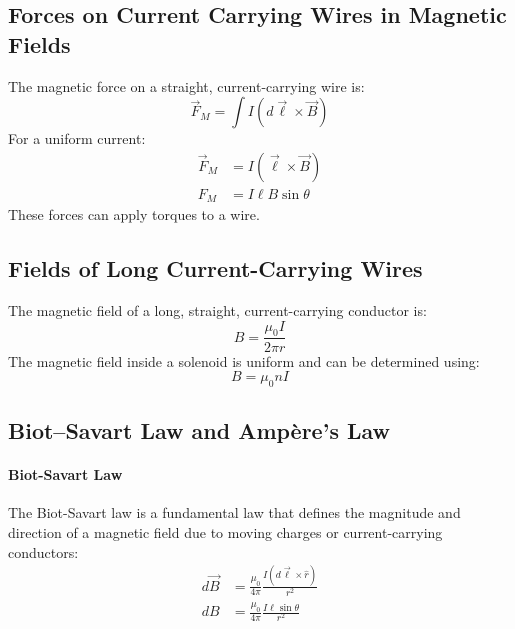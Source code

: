 \documentclass{article}
\begin{document}
        \subsection{Forces on Current Carrying Wires in Magnetic Fields}
            The magnetic force on a straight, current-carrying wire is:
            \begin{equation}
                \vec{F}_M = \int I \left(d\vec{\ell} \times \vec{B} \right)
            \end{equation}
            For a uniform current:
            \begin{align}
                \vec{F}_M &= I \left( \vec{\ell} \times \vec{B} \right) \\
                F_M &= I \ell B \sin \theta
            \end{align}
            These forces can apply torques to a wire.

        \subsection{Fields of Long Current-Carrying Wires}
            The magnetic field of a long, straight, current-carrying conductor is:
            \begin{equation}
                B = \frac{\mu_0 I}{2 \pi r}
            \end{equation}
            The magnetic field inside a solenoid is uniform and can be determined using:
            \begin{equation}
                B = \mu_0 n I
            \end{equation}

        \subsection{Biot–Savart Law and Amp\`{e}re's Law}
            \paragraph{Biot-Savart Law}
            The Biot-Savart law is a fundamental law that defines the magnitude and direction of a magnetic field due to moving charges or current-carrying conductors:
            \begin{align}
                d\vec{B} &= \frac{\mu_0}{4 \pi} \frac{I \left( d\vec{\ell} \times \hat{r} \right)}{r^2} \\
                dB &= \frac{\mu_0}{4 \pi} \frac{I \ell \sin \theta}{r^2}
            \end{align}
\end{document}
